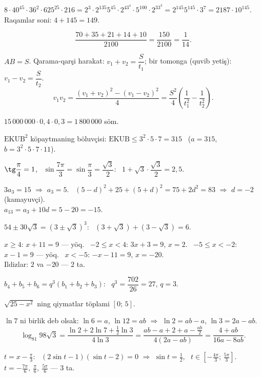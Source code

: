 




$8\cdot40^{45}\cdot36^2\cdot625^{25}\cdot216=2^3\cdot2^{135}5^{45}\cdot2^43^4\cdot5^{100}\cdot2^33^3=2^{145}5^{145}\cdot3^7=2187\cdot10^{145}$.\\
Raqamlar soni: $4+145=149$.

\[\frac{70+35+21+14+10}{2100}=\frac{150}{2100}=\frac1{14}.\]

$AB=S$. Qarama-qarşi harakat: $v_1+v_2=\dfrac S{t_1}$; bir tomonga (quvib yetiş): $v_1-v_2=\dfrac S{t_2}$.
\[v_1v_2=\frac{(v_1+v_2)^2-(v_1-v_2)^2}4=\frac{S^2}4\left(\frac1{t_1^2}-\frac1{t_2^2}\right).\]

$15\,000\,000\cdot0{,}4\cdot0{,}3=1\,800\,000$ söm.

$\text{EKUB}^2$ köpaytmaning böluvçisi: $\text{EKUB}\le3^2\cdot5\cdot7=315$ \ ($a=315$, $b=3^2\cdot5\cdot7\cdot11$).

$\tg\dfrac\pi4=1$, \ $\sin\dfrac{7\pi}3=\sin\dfrac\pi3=\dfrac{\sqrt3}2$: \ $1+\sqrt3\cdot\dfrac{\sqrt3}2=2{,}5$.

$3a_3=15$ $\Rightarrow$ $a_3=5$. \ $(5-d)^2+25+(5+d)^2=75+2d^2=83$ $\Rightarrow$ $d=-2$ (kamayuvçi).\\
$a_{13}=a_3+10d=5-20=-15$.

$54\pm30\sqrt3=\left(3\pm\sqrt3\right)^3$: \ $\left(3+\sqrt3\right)+\left(3-\sqrt3\right)=6$.

$x\ge4$: $x+11=9$ — yöq. \ $-2\le x<4$: $3x+3=9$, $x=2$. \ $-5\le x<-2$: $x-1=9$ — yöq. \ $x<-5$: $-x-11=9$, $x=-20$.\\
Ildizlar: $2$ va $-20$ — $2$ ta.

$b_4+b_5+b_6=q^3(b_1+b_2+b_3)$: \ $q^3=\dfrac{702}{26}=27$, $q=3$.

$\sqrt{25-x^2}$ ning qiymatlar töplami $[0;\,5]$.

$\ln7$ ni birlik deb olsak: $\ln6=a$, $\ln12=ab$ $\Rightarrow$ $\ln2=ab-a$, $\ln3=2a-ab$.
\[\log_{81}98\sqrt3=\frac{\ln2+2\ln7+\frac12\ln3}{4\ln3}=\frac{ab-a+2+a-\frac{ab}2}{4(2a-ab)}=\frac{4+ab}{16a-8ab}.\]

$t=x-\frac\pi3$: \ $(2\sin t-1)(\sin t-2)=0$ $\Rightarrow$ $\sin t=\frac12$, \ $t\in\left[-\frac{4\pi}3;\,\frac{5\pi}3\right]$.\\
$t=-\frac{7\pi}6,\ \frac\pi6,\ \frac{5\pi}6$ — $3$ ta.

